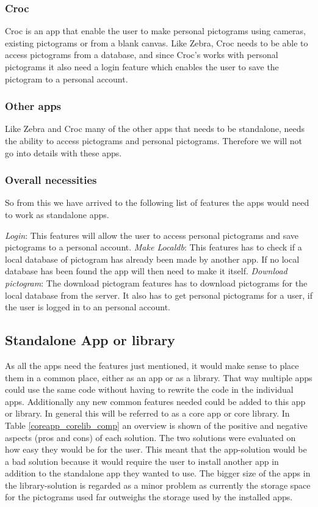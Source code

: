 \subsubsection{Croc}
Croc is an app that enable the user to make personal pictograms using cameras, existing pictograms or from a blank canvas. Like Zebra, Croc needs to be able to access pictograms from a database, and since Croc’s works with personal pictograms it also need a login feature which enables the user to save the pictogram to a personal account.
\subsubsection{Other apps}
Like Zebra and Croc many of the other apps that needs to be standalone, needs the ability to access pictograms and personal pictograms. Therefore we will not go into details with these apps.
\subsubsection{Overall necessities}
So from this we have arrived to the following list of features the apps would need to work as standalone apps. 

\textit{Login}:
This features will allow the user to access personal pictograms and save pictograms to a personal account.
\textit{Make Localdb}:
This features has to check if a local database of pictogram has already been made by another app. If no local database has been found the app will then need to make it itself. 
\textit{Download pictogram}:
The download pictogram features has to download pictograms for the local database from the server. It also has to get personal pictograms for a user, if the user is logged in to an personal account.


\subsection{Standalone App or library}
As all the apps need the features just mentioned, it would make sense to place them in a common place, either as an app or as a library. That way multiple apps could use the same code without having to rewrite the code in the individual apps. Additionally any new common features needed could be added to this app or library. In general this will be referred to as a core app or core library.
In Table \ref{coreapp_corelib_comp} an overview is shown of the positive and negative aspects (pros and cons) of each solution. The two solutions were evaluated on how easy they would be for the user. This meant that the app-solution would be a bad solution because it would require the user to install another app in addition to the standalone app they wanted to use. The bigger size of the apps in the library-solution is regarded as a minor problem as currently the storage space for the pictograms used far outweighs the storage used by the installed apps.

